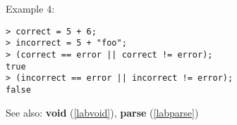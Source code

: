 \noindent Example 4: 
\begin{center}\begin{minipage}{15cm}\begin{Verbatim}[frame=single]
> correct = 5 + 6;
> incorrect = 5 + "foo";
> (correct == error || correct != error);
true
> (incorrect == error || incorrect != error);
false
\end{Verbatim}
\end{minipage}\end{center}
See also: \textbf{void} (\ref{labvoid}), \textbf{parse} (\ref{labparse})
